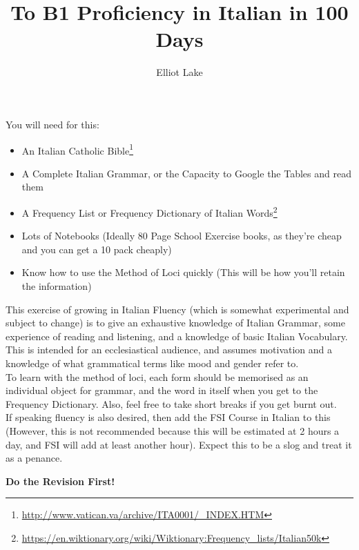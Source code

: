 \documentclass{article}[10pt]
\author{Elliot Lake}
\title{To B1 Proficiency in Italian in 100 Days}
\begin{document}
\maketitle
You will need for this:
\begin{itemize}
	\item An Italian Catholic Bible\footnote{\url{http://www.vatican.va/archive/ITA0001/_INDEX.HTM}}
	\item A Complete Italian Grammar, or the Capacity to Google the Tables and read them
	\item A Frequency List or Frequency Dictionary of Italian Words\footnote{\url{https://en.wiktionary.org/wiki/Wiktionary:Frequency_lists/Italian50k}}
	\item Lots of Notebooks (Ideally 80 Page School Exercise books, as they're cheap and you can get a 10 pack cheaply)
	\item Know how to use the Method of Loci quickly (This will be how you'll retain the information)
\end{itemize}

This exercise of growing in Italian Fluency (which is somewhat experimental and subject to change) is to give an exhaustive knowledge of Italian Grammar, some experience of reading and listening, and a knowledge of basic Italian Vocabulary. This is intended for an ecclesiastical audience, and assumes motivation and a knowledge of what grammatical terms like mood and gender refer to. \\


To learn with the method of loci, each form should be memorised as an individual object for grammar, and the word in itself when you get to the Frequency Dictionary. Also, feel free to take short breaks if you get burnt out.\\

If speaking fluency is also desired, then add the FSI Course in Italian to this (However, this is not recommended because this will be estimated at 2 hours a day, and FSI will add at least another hour). Expect this to be a slog and treat it as a penance. 

\textbf{Do the Revision First!}
\end{document}
